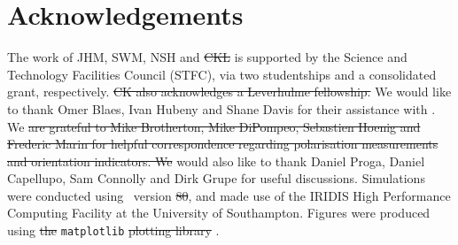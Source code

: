 \documentclass[preprint, a4paper, 11pt]{aastex}
\providecommand{\DIFadd}[1]{{\protect\color{blue}\uwave{#1}}} %
\providecommand{\DIFdel}[1]{{\protect\color{red}\sout{#1}}}                      %
\providecommand{\DIFaddbegin}{} %
\providecommand{\DIFaddend}{} %
\providecommand{\DIFdelbegin}{} %
\providecommand{\DIFdelend}{} %
\begin{document}
\DIFdelbegin %

\DIFdelend \section*{Acknowledgements}

The work of JHM, SWM, NSH and \DIFdelbegin \DIFdel{CKL }\DIFdelend \DIFaddbegin \DIFadd{CK }\DIFaddend is supported by the 
Science and Technology Facilities Council (STFC), 
via two studentships and a consolidated grant, respectively.
\DIFdelbegin \DIFdel{CK also acknowledges a Leverhulme fellowship.
}\DIFdelend We would like to thank Omer Blaes, Ivan Hubeny and Shane Davis for their
assistance with \agn. We \DIFdelbegin \DIFdel{are grateful to Mike Brotherton, Mike DiPompeo,
Sebastien Hoenig and Frederic Marin for helpful correspondence regarding
polarisation measurements and orientation indicators.
We }\DIFdelend would also like to thank Daniel Proga, 
Daniel Capellupo, Sam Connolly and Dirk Grupe for useful discussions.
Simulations were conducted using \py\ version \DIFdelbegin \DIFdel{80}\DIFdelend \DIFaddbegin \DIFadd{79c}\DIFaddend , and made use of
the IRIDIS High Performance Computing Facility at the University of Southampton.
Figures were produced using \DIFdelbegin \DIFdel{the }\DIFdelend {\tt matplotlib} \DIFdelbegin \DIFdel{plotting library
}\DIFdelend \citep{matplotlib}.
\end{document}

